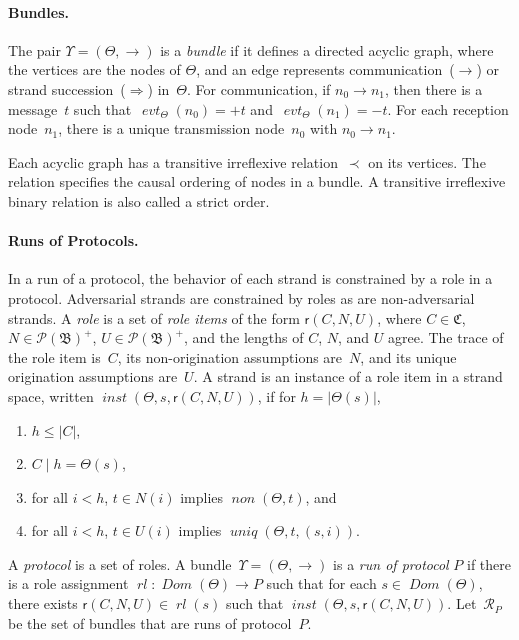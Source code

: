 \documentclass[titlepage,12pt]{article}
\newcommand{\fn}[1]{\ensuremath{\operatorname{\mathit{#1}}}}
\newcommand{\typ}{\mathbin:}
\newcommand{\sdom}{\fn{Dom}}
\newcommand{\inbnd}{\mathord -}
\newcommand{\outbnd}{\mathord +}
\newcommand{\pow}[1]{\mathcal P(#1)}
\newcommand{\prefix}[2]{#1\mid#2}
\newcommand{\run}{\mathcal{R}}
\newcommand{\alg}[1]{\ensuremath{\mathfrak#1}}
\newcommand{\tr}{\ensuremath{\mathfrak C}}
\newcommand{\rl}{\fn{rl}}
\newcommand{\evt}{\fn{evt}}
\newcommand{\role}{\mathsf{r}}
\begin{document}
\paragraph{Bundles.}
The pair $\Upsilon=(\Theta,\to)$ is a \emph{bundle} if
it defines a directed acyclic graph, where the vertices are the nodes
of $\Theta$, and an edge represents communication~($\rightarrow$) or
strand succession~($\Rightarrow$) in~$\Theta$.  For communication, if
$n_0\rightarrow n_1$, then there is a message~$t$ such
that~$\evt_\Theta(n_0)=\outbnd t$ and~$\evt_\Theta(n_1)=\inbnd t$.
For each reception node~$n_1$, there is a unique transmission
node~$n_0$ with $n_0\rightarrow n_1$.

Each acyclic graph has a transitive irreflexive
relation~$\prec$ on its vertices.
The relation specifies the causal ordering of nodes in a bundle.  A
transitive irreflexive binary relation is also called a strict order.

\paragraph{Runs of Protocols.}
In a run of a protocol, the behavior of each strand is constrained by
a role in a protocol.  Adversarial strands are constrained by roles as
are non-adversarial strands.  A \emph{role} is a set of
\emph{role items} of the form $\role(C,N,U)$, where $C\in\tr$,
$N\in\pow{\alg{B}}^+$, $U\in\pow{\alg{B}}^+$, and the lengths of $C$,
$N$, and $U$ agree.  The trace of the role item is~$C$, its
non-origination assumptions are~$N$, and its unique origination
assumptions are~$U$.  A strand is an instance of a role item in a
strand space, written $\fn{inst}(\Theta,s,\role(C,N,U))$, if for
$h=|\Theta(s)|$,
\begin{enumerate}
\item $h\leq|C|$,
\item $\prefix{C}{h}=\Theta(s)$,
\item for all $i<h$, $t\in N(i)$ implies $\fn{non}(\Theta,t)$, and
\item for all $i<h$, $t\in U(i)$ implies $\fn{uniq}(\Theta,t,(s,i))$.
\end{enumerate}

A \emph{protocol} is a set of roles.  A
bundle~$\Upsilon=(\Theta,\to)$ is a \emph{run of
  protocol} $P$ if there is a role assignment
$\rl\typ\sdom(\Theta)\to P$ such that for each $s\in\sdom(\Theta)$,
there exists $\role(C,N,U)\in\rl(s)$ such that
\index{inst@\fn{inst}}$\fn{inst}(\Theta,s,\role(C,N,U))$.  Let~$\run_P$ be
the set of bundles that are runs of protocol~$P$.
\end{document}
